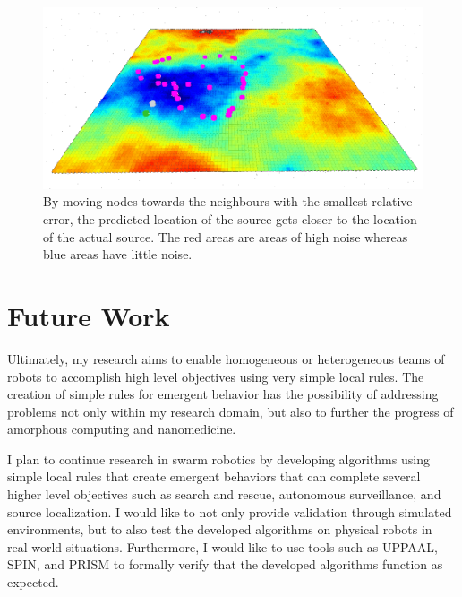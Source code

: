 \documentclass{article}
\begin{document}
\begin{figure}[h!]

    \centering

    \includegraphics[width=\linewidth]{figs/malt}

    \caption{By moving nodes towards the neighbours with the smallest
    relative error, the predicted location of the source gets closer to the
location of the actual source. The red areas are areas of high noise whereas
blue areas have little noise.}

    \label{fig:malt}

\end{figure}

\section{Future Work}

Ultimately, my research aims to enable homogeneous or heterogeneous teams of
robots to accomplish high level objectives using very simple local rules. The
creation of simple rules for emergent behavior has the possibility of
addressing problems not only within my research domain, but also to further the
progress of amorphous computing and nanomedicine.

I plan to continue research in swarm robotics by developing algorithms using
simple local rules that create emergent behaviors that can complete several
higher level objectives such as search and rescue, autonomous surveillance, and
source localization. I would like to not only provide validation through
simulated environments, but to also test the developed algorithms on physical
robots in real-world situations. Furthermore, I would like to use tools such as
UPPAAL, SPIN, and PRISM to formally verify that the developed algorithms
function as expected.
\end{document}

